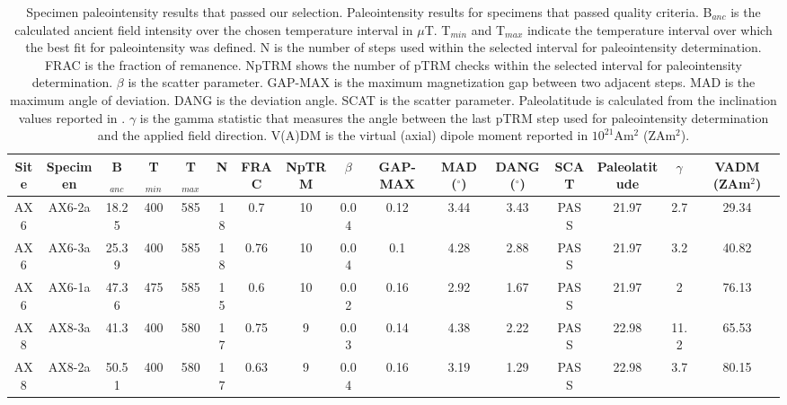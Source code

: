 \documentclass[9pt,twoside,lineno]{pnas-new}
\begin{document}
\clearpage

\begin{table}
\caption{\footnotesize{Specimen paleointensity results that passed our selection. Paleointensity results for specimens that passed quality criteria. B$_{anc}$ is the calculated ancient field intensity over the chosen temperature interval in $\mu$T. T$_{min}$ and T$_{max}$ indicate the temperature interval over which the best fit for paleointensity was defined. N is the number of steps used within the selected interval for paleointensity determination. FRAC is the fraction of remanence. NpTRM shows the number of pTRM checks within the selected interval for paleointensity determination. $\beta$ is the scatter parameter.  GAP-MAX is the maximum magnetization gap between two adjacent steps. MAD is the maximum angle of deviation. DANG is the deviation angle. SCAT is the scatter parameter. Paleolatitude is calculated from the inclination values reported in \cite{Zhang2021b}. $\gamma$ is the gamma statistic that measures the angle between the last pTRM step used for paleointensity determination and the applied field direction. V(A)DM is the virtual (axial) dipole moment reported in $10^{21}$Am$^2$ (ZAm$^2$). }}
\centering
\begin{tabular}{cccccccccccccccc}
\hline
Site & Specimen & B$_{anc}$ & T$_{min}$ & T$_{max}$ & N    & FRAC & NpTRM & $\beta$ & GAP-MAX & MAD ($^\circ$) & DANG ($^\circ$) & SCAT & Paleolatitude & $\gamma$ & VADM (ZAm$^2$) \\
\hline
AX6  & AX6-2a   & 18.25     & 400       & 585       & 18 & 0.7  & 10    & 0.04    & 0.12    & 3.44           & 3.43            & PASS & 21.97         & 2.7      & 29.34         \\
AX6  & AX6-3a   & 25.39     & 400       & 585       & 18 & 0.76 & 10    & 0.04    & 0.1     & 4.28           & 2.88            & PASS & 21.97         & 3.2      & 40.82         \\
AX6  & AX6-1a   & 47.36     & 475       & 585       & 15 & 0.6  & 10    & 0.02    & 0.16    & 2.92           & 1.67            & PASS & 21.97         & 2        & 76.13         \\
AX8  & AX8-3a   & 41.3      & 400       & 580       & 17 & 0.75 & 9     & 0.03    & 0.14    & 4.38           & 2.22            & PASS & 22.98         & 11.2     & 65.53         \\
AX8  & AX8-2a   & 50.51     & 400       & 580       & 17 & 0.63 & 9     & 0.04    & 0.16    & 3.19           & 1.29            & PASS & 22.98         & 3.7      & 80.15         \\

\end{tabular}
\end{table}
\end{document}
